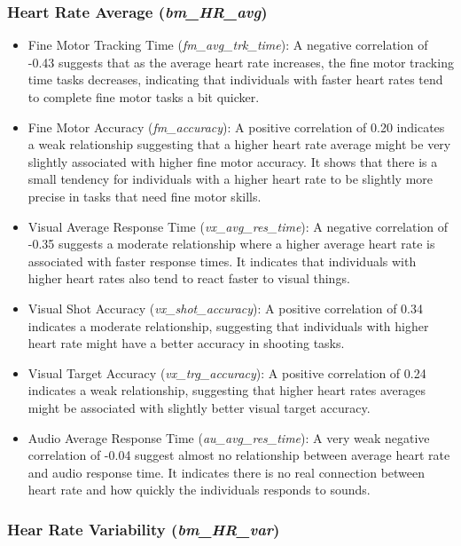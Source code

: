 \subsubsection*{Heart Rate Average (\textit{bm\_HR\_avg})}
\begin{itemize}
    \item Fine Motor Tracking Time (\textit{fm\_avg\_trk\_time}): A negative correlation of \\ -0.43 suggests that as the average heart rate increases, the fine motor
          tracking time tasks decreases, indicating that individuals with faster heart rates tend to complete fine motor tasks a bit quicker.
    \item Fine Motor Accuracy (\textit{fm\_accuracy}): A positive correlation of 0.20 indicates a weak relationship suggesting that a higher heart rate average might be very
          slightly associated with higher fine motor accuracy. It shows that there is a small tendency for individuals with a higher heart rate to be slightly more precise
          in tasks that need fine motor skills.
    \item Visual Average Response Time (\textit{vx\_avg\_res\_time}): A negative correlation of -0.35 suggests a moderate relationship where a higher average heart rate
          is associated with faster response times. It indicates that individuals with higher heart rates also tend to react faster to visual things.
    \item Visual Shot Accuracy (\textit{vx\_shot\_accuracy}): A positive correlation of 0.34 indicates a moderate relationship, suggesting that individuals with higher heart
          rate might have a better accuracy in shooting tasks.
    \item Visual Target Accuracy (\textit{vx\_trg\_accuracy}): A positive correlation of 0.24 indicates a weak relationship, suggesting that higher heart rates averages might
          be associated with slightly better visual target accuracy.
    \item Audio Average Response Time (\textit{au\_avg\_res\_time}): A very weak negative correlation of -0.04 suggest almost no relationship between average heart rate
          and audio response time. It indicates there is no real connection between heart rate and how quickly the individuals responds to sounds.
\end{itemize}

\subsubsection*{Hear Rate Variability (\textit{bm\_HR\_var})}

